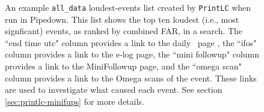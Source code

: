 \clearpage

\begin{figure}[p]
\label{fig:example-loudest_all_data_events}
\center
{}
\caption{An example \texttt{all\_data} loudest-events list created by
\texttt{PrintLC} when run in Pipedown. This list shows the top ten loudest
(i.e., most signficant) events, as ranked by combined FAR, in a search. The
``end time utc" column provides a link to the daily \ihope~page
\cite{Pekowsky:thesis}, the ``ifos" column provides a link to the e-log page,
the ``mini followup" column provides a link to the MiniFollowup page, and the
``omega scan" column provides a link to the Omega scans of the event. These
links are used to investigate what caused each event. See section
\ref{sec:printlc-minifups} for more details.}
\end{figure}

